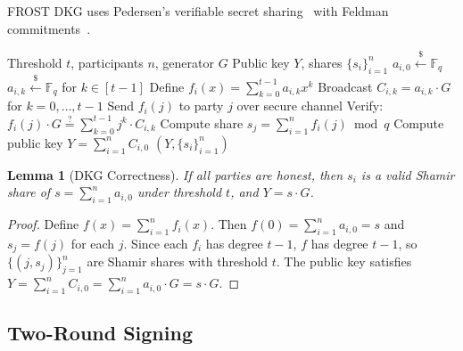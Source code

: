 \documentclass[11pt,twocolumn]{article}
\newtheorem{lemma}[theorem]{Lemma}
\begin{document}
FROST DKG uses Pedersen's verifiable secret sharing~\cite{pedersen1991} with
Feldman commitments~\cite{feldman1987}.

\begin{algorithm}[H]
\caption{FROST Distributed Key Generation}
\label{alg:frost-dkg}
\begin{algorithmic}[1]
\Require Threshold $t$, participants $n$, generator $G$
\Ensure Public key $Y$, shares $\{s_i\}_{i=1}^n$
  \State $a_{i,0} \xleftarrow{\$} \mathbb{F}_q$ 
  \State $a_{i,k} \xleftarrow{\$} \mathbb{F}_q$ for $k \in [t-1]$
  \State Define $f_i(x) = \sum_{k=0}^{t-1} a_{i,k} x^k$
  \State Broadcast $C_{i,k} = a_{i,k} \cdot G$ for $k = 0, \ldots, t-1$
  \State Send $f_i(j)$ to party $j$ over secure channel
\EndFor
{}
  \State Verify: $f_i(j) \cdot G \stackrel{?}{=} \sum_{k=0}^{t-1} j^k \cdot C_{i,k}$
  \State Compute share $s_j = \sum_{i=1}^n f_i(j) \bmod q$
  \State Compute public key $Y = \sum_{i=1}^n C_{i,0}$
\EndFor
\State \Return $(Y, \{s_i\}_{i=1}^n)$
\end{algorithmic}
\end{algorithm}

\begin{lemma}[DKG Correctness]
\label{lem:dkg-correct}
If all parties are honest, then $s_i$ is a valid Shamir share of
$s = \sum_{i=1}^n a_{i,0}$ under threshold $t$, and $Y = s \cdot G$.
\end{lemma}

\begin{proof}
Define $f(x) = \sum_{i=1}^n f_i(x)$. Then $f(0) = \sum_{i=1}^n a_{i,0} = s$ and
$s_j = f(j)$ for each $j$. Since each $f_i$ has degree $t-1$, $f$ has degree $t-1$,
so $\{(j, s_j)\}_{j=1}^n$ are Shamir shares with threshold $t$. The public key
satisfies $Y = \sum_{i=1}^n C_{i,0} = \sum_{i=1}^n a_{i,0} \cdot G = s \cdot G$.
\end{proof}

\subsection{Two-Round Signing}
\end{document}
